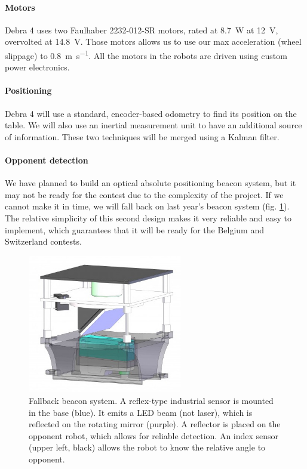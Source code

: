\documentclass[a4paper]{paper}
\begin{document}
\paragraph{Motors}
Debra 4 uses two Faulhaber 2232-012-SR motors, rated at \SI{8.7}{\watt} at \SI{12}{\volt}, overvolted at \SI{14.8}{\volt}.
Those motors allows us to use our max acceleration (wheel slippage) to \SI{0.8}{\meter\per\second}.
All the motors in the robots are driven using custom power electronics.

\paragraph{Positioning}
Debra 4 will use a standard, encoder-based odometry to find its position on the table.
We will also use an inertial measurement unit to have an additional source of information.
These two techniques will be merged using a Kalman filter.

\paragraph{Opponent detection}
We have planned to build an optical absolute positioning beacon system, but it may not be ready for the contest due to the complexity of the project.
If we cannot make it in time, we will fall back on last year's beacon system (fig. \ref{fig:balise}).
The relative simplicity of this second design makes it very reliable and easy to implement, which guarantees that it will be ready for the Belgium and Switzerland contests.

\begin{figure}[h]
    \begin{center}
        \includegraphics[width=0.6\textwidth]{images/Balise}
        \caption{Fallback beacon system.
            A reflex-type industrial sensor is mounted in the base (blue).
            It emits a LED beam (not laser), which is reflected on the rotating mirror (purple).
            A reflector is placed on the opponent robot, which allows for reliable detection.
            An index sensor (upper left, black) allows the robot to know the relative angle to opponent.
        }
        \label{fig:balise}
    \end{center}
\end{figure}
\end{document}
